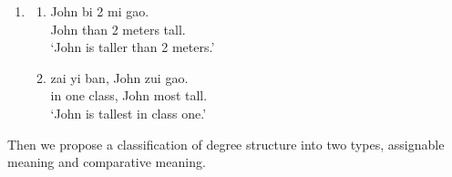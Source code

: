 \documentclass{ctexart}
\begin{document}
\begin{enumerate}
    \item
    \begin{enumerate}
        \item \label{specific_value_comparison_example}
        John bi 2 mi gao.\\
        John than 2 meters tall. \\
        `John is taller than 2 meters.'

        \item \label{individual_set_comparison_example}
        zai yi ban, John zui gao.\\
        in one class, John most tall.\\
        `John is tallest in class one.'

    \end{enumerate}
\end{enumerate}

Then we propose a classification of degree structure into two types, assignable meaning and comparative meaning.
\end{document}
